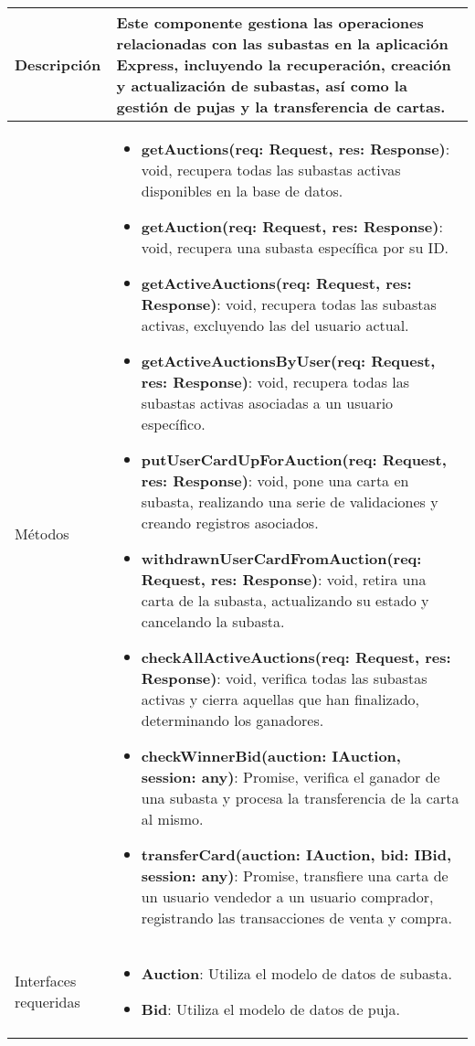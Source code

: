 \begin{longtable}{
    >{\columncolor{lightgreen!20}}p{4cm}
    p{12cm}
    }
    \midrule
    Descripción & Este componente gestiona las operaciones relacionadas con las subastas en la aplicación Express, incluyendo la recuperación, creación y actualización de subastas, así como la gestión de pujas y la transferencia de cartas. \\
    \midrule
    Métodos & \begin{itemize}[nosep,leftmargin=*]
      \item \textbf{getAuctions(req: Request, res: Response)}: void, recupera todas las subastas activas disponibles en la base de datos.
      \item \textbf{getAuction(req: Request, res: Response)}: void, recupera una subasta específica por su ID.
      \item \textbf{getActiveAuctions(req: Request, res: Response)}: void, recupera todas las subastas activas, excluyendo las del usuario actual.
      \item \textbf{getActiveAuctionsByUser(req: Request, res: Response)}: void, recupera todas las subastas activas asociadas a un usuario específico.
      \item \textbf{putUserCardUpForAuction(req: Request, res: Response)}: void, pone una carta en subasta, realizando una serie de validaciones y creando registros asociados.
      \item \textbf{withdrawnUserCardFromAuction(req: Request, res: Response)}: void, retira una carta de la subasta, actualizando su estado y cancelando la subasta.
      \item \textbf{checkAllActiveAuctions(req: Request, res: Response)}: void, verifica todas las subastas activas y cierra aquellas que han finalizado, determinando los ganadores.
      \item \textbf{checkWinnerBid(auction: IAuction, session: any)}: Promise, verifica el ganador de una subasta y procesa la transferencia de la carta al mismo.
      \item \textbf{transferCard(auction: IAuction, bid: IBid, session: any)}: Promise, transfiere una carta de un usuario vendedor a un usuario comprador, registrando las transacciones de venta y compra.
    \end{itemize} \\
    \midrule
    Interfaces requeridas & \begin{itemize}[nosep,leftmargin=*]
      \item \textbf{Auction}: Utiliza el modelo de datos de subasta.
      \item \textbf{Bid}: Utiliza el modelo de datos de puja.

\end{itemize}
\end{longtable}
